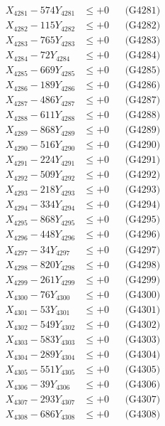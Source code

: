 \documentclass[a4paper,10pt]{article}
\begin{document}
{\begin{align}
\allowbreak
X_{4281} - 574Y_{4281} &\leq +0 && \text{(G4281)} \\
X_{4282} - 115Y_{4282} &\leq +0 && \text{(G4282)} \\
X_{4283} - 765Y_{4283} &\leq +0 && \text{(G4283)} \\
X_{4284} - 72Y_{4284} &\leq +0 && \text{(G4284)} \\
X_{4285} - 669Y_{4285} &\leq +0 && \text{(G4285)} \\
X_{4286} - 189Y_{4286} &\leq +0 && \text{(G4286)} \\
X_{4287} - 486Y_{4287} &\leq +0 && \text{(G4287)} \\
X_{4288} - 611Y_{4288} &\leq +0 && \text{(G4288)} \\
X_{4289} - 868Y_{4289} &\leq +0 && \text{(G4289)} \\
X_{4290} - 516Y_{4290} &\leq +0 && \text{(G4290)} \\
\allowbreak
X_{4291} - 224Y_{4291} &\leq +0 && \text{(G4291)} \\
X_{4292} - 509Y_{4292} &\leq +0 && \text{(G4292)} \\
X_{4293} - 218Y_{4293} &\leq +0 && \text{(G4293)} \\
X_{4294} - 334Y_{4294} &\leq +0 && \text{(G4294)} \\
X_{4295} - 868Y_{4295} &\leq +0 && \text{(G4295)} \\
X_{4296} - 448Y_{4296} &\leq +0 && \text{(G4296)} \\
X_{4297} - 34Y_{4297} &\leq +0 && \text{(G4297)} \\
X_{4298} - 820Y_{4298} &\leq +0 && \text{(G4298)} \\
X_{4299} - 261Y_{4299} &\leq +0 && \text{(G4299)} \\
X_{4300} - 76Y_{4300} &\leq +0 && \text{(G4300)} \\
\allowbreak
X_{4301} - 53Y_{4301} &\leq +0 && \text{(G4301)} \\
X_{4302} - 549Y_{4302} &\leq +0 && \text{(G4302)} \\
X_{4303} - 583Y_{4303} &\leq +0 && \text{(G4303)} \\
X_{4304} - 289Y_{4304} &\leq +0 && \text{(G4304)} \\
X_{4305} - 551Y_{4305} &\leq +0 && \text{(G4305)} \\
X_{4306} - 39Y_{4306} &\leq +0 && \text{(G4306)} \\
X_{4307} - 293Y_{4307} &\leq +0 && \text{(G4307)} \\
X_{4308} - 686Y_{4308} &\leq +0 && \text{(G4308)} \\

\end{align}}
\end{document}
